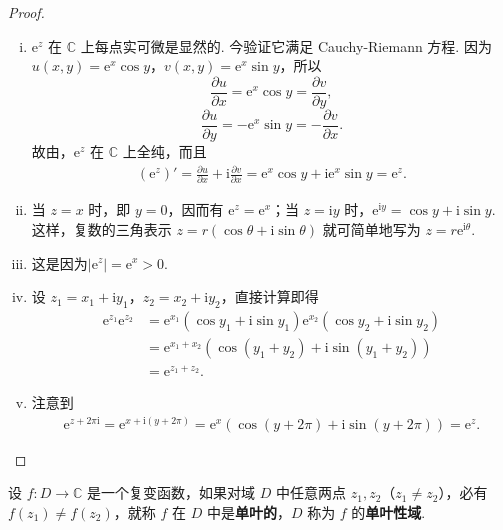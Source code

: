 \documentclass[../../main.tex]{subfiles}
\begin{document}
\begin{proof}
\begin{enumerate}[(i)]
\item \( \mathrm{e}^z \) 在 \( \mathbb{C} \) 上每点实可微是显然的. 今验证它满足 Cauchy-Riemann 方程. 因为 \( u(x, y) = \mathrm{e}^x \cos y \)，\( v(x, y) = \mathrm{e}^x \sin y \)，所以
\[
\frac{\partial u}{\partial x} = \mathrm{e}^x \cos y = \frac{\partial v}{\partial y},
\]
\[
\frac{\partial u}{\partial y} = -\mathrm{e}^x \sin y = -\frac{\partial v}{\partial x}.
\]
故由，\( \mathrm{e}^z \) 在 \( \mathbb{C} \) 上全纯，而且
\begin{align*}
(\mathrm{e}^z)' = \frac{\partial u}{\partial x} + \mathrm{i} \frac{\partial v}{\partial x}= \mathrm{e}^x \cos y + \mathrm{i} \mathrm{e}^x \sin y= \mathrm{e}^z.
\end{align*}

\item 当 \( z = x \) 时，即 \( y = 0 \)，因而有 \( \mathrm{e}^z = \mathrm{e}^x \)；当 \( z = \mathrm{i}y \) 时，\( \mathrm{e}^{\mathrm{i}y} = \cos y + \mathrm{i}\sin y \). 这样，复数的三角表示 \( z = r(\cos\theta + \mathrm{i}\sin\theta) \) 就可简单地写为 \( z = r\mathrm{e}^{\mathrm{i}\theta} \).

\item 这是因为$|\mathrm{e}^z| = \mathrm{e}^x > 0.$

\item 设 \( z_1 = x_1 + \mathrm{i}y_1 \)，\( z_2 = x_2 + \mathrm{i}y_2 \)，直接计算即得
\begin{align*}
\mathrm{e}^{z_1} \mathrm{e}^{z_2} &= \mathrm{e}^{x_1} (\cos y_1 + \mathrm{i}\sin y_1) \mathrm{e}^{x_2} (\cos y_2 + \mathrm{i}\sin y_2)\\
&= \mathrm{e}^{x_1 + x_2} (\cos(y_1 + y_2) + \mathrm{i}\sin(y_1 + y_2))\\
&= \mathrm{e}^{z_1 + z_2}.
\end{align*}

\item 注意到
\begin{align*}
\mathrm{e}^{z + 2\pi\mathrm{i}} = \mathrm{e}^{x + \mathrm{i}(y + 2\pi)}= \mathrm{e}^x (\cos(y + 2\pi) + \mathrm{i}\sin(y + 2\pi))= \mathrm{e}^z.
\end{align*}
\end{enumerate}
\end{proof}

\begin{definition}\label{definition:单叶性域}
设 \( f:D \to \mathbb{C} \) 是一个复变函数，如果对域 \( D \) 中任意两点 \( z_1, z_2 \)（\( z_1 \neq z_2 \)），必有 \( f(z_1) \neq f(z_2) \)，就称 \( f \) 在 \( D \) 中是\textbf{单叶的}，\( D \) 称为 \( f \) 的\textbf{单叶性域}.
\end{definition}
\end{document}
